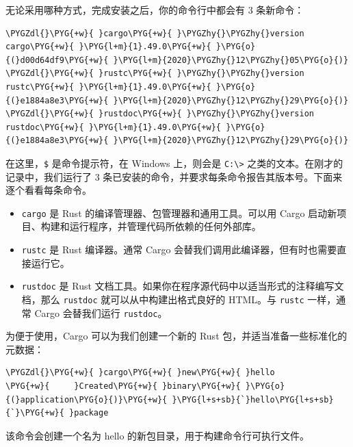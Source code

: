 无论采用哪种方式，完成安装之后，你的命令行中都会有 3 条新命令：

\begin{Verbatim}[commandchars=\\\{\},breaklines=true,breakanywhere=true,fontsize=\codefont,xleftmargin=17bp]
\PYGZdl{}\PYG{+w}{ }cargo\PYG{+w}{ }\PYGZhy{}\PYGZhy{}version
cargo\PYG{+w}{ }\PYG{l+m}{1}.49.0\PYG{+w}{ }\PYG{o}{(}d00d64df9\PYG{+w}{ }\PYG{l+m}{2020}\PYGZhy{}12\PYGZhy{}05\PYG{o}{)}
\PYGZdl{}\PYG{+w}{ }rustc\PYG{+w}{ }\PYGZhy{}\PYGZhy{}version
rustc\PYG{+w}{ }\PYG{l+m}{1}.49.0\PYG{+w}{ }\PYG{o}{(}e1884a8e3\PYG{+w}{ }\PYG{l+m}{2020}\PYGZhy{}12\PYGZhy{}29\PYG{o}{)}
\PYGZdl{}\PYG{+w}{ }rustdoc\PYG{+w}{ }\PYGZhy{}\PYGZhy{}version
rustdoc\PYG{+w}{ }\PYG{l+m}{1}.49.0\PYG{+w}{ }\PYG{o}{(}e1884a8e3\PYG{+w}{ }\PYG{l+m}{2020}\PYGZhy{}12\PYGZhy{}29\PYG{o}{)}
\end{Verbatim}

在这里，\texttt{\$} 是命令提示符，在 Windows 上，则会是 \texttt{C:\textbackslash{}>} 之类的文本。在刚才的记录中，我们运行了 3 条已安装的命令，并要求每条命令报告其版本号。下面来逐个看看每条命令。

\begin{itemize}
\item \texttt{cargo} 是 Rust 的编译管理器、包管理器和通用工具。可以用 Cargo 启动新项目、构建和运行程序，并管理代码所依赖的任何外部库。
\item \texttt{rustc} 是 Rust 编译器。通常 Cargo 会替我们调用此编译器，但有时也需要直接运行它。
\item \texttt{rustdoc} 是 Rust 文档工具。如果你在程序源代码中以适当形式的注释编写文档，那么 \texttt{rustdoc} 就可以从中构建出格式良好的 HTML。与 \texttt{rustc} 一样，通常 Cargo 会替我们运行 \texttt{rustdoc}。
\end{itemize}

为便于使用，Cargo 可以为我们创建一个新的 Rust 包，并适当准备一些标准化的元数据：

\begin{Verbatim}[commandchars=\\\{\},breaklines=true,breakanywhere=true,fontsize=\codefont,xleftmargin=17bp]
\PYGZdl{}\PYG{+w}{ }cargo\PYG{+w}{ }new\PYG{+w}{ }hello
\PYG{+w}{     }Created\PYG{+w}{ }binary\PYG{+w}{ }\PYG{o}{(}application\PYG{o}{)}\PYG{+w}{ }\PYG{l+s+sb}{`}hello\PYG{l+s+sb}{`}\PYG{+w}{ }package
\end{Verbatim}

该命令会创建一个名为 hello 的新包目录，用于构建命令行可执行文件。

